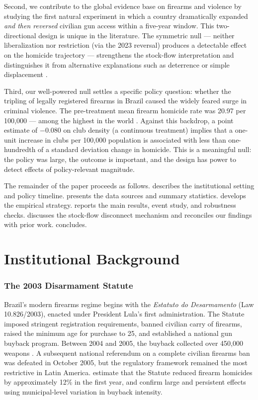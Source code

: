 \documentclass[12pt]{article}
\begin{document}
Second, we contribute to the global evidence base on firearms and violence by studying the first natural experiment in which a country dramatically expanded \textit{and then reversed} civilian gun access within a five-year window. This two-directional design is unique in the literature. The symmetric null --- neither liberalization nor restriction (via the 2023 reversal) produces a detectable effect on the homicide trajectory --- strengthens the stock-flow interpretation and distinguishes it from alternative explanations such as deterrence \citep{lottmustard1997} or simple displacement \citep{levitt2004crime}.

Third, our well-powered null settles a specific policy question: whether the tripling of legally registered firearms in Brazil caused the widely feared surge in criminal violence. The pre-treatment mean firearm homicide rate was 20.97 per 100,000 --- among the highest in the world \citep{soares2006homicide}. Against this backdrop, a point estimate of $-0.080$ on club density (a continuous treatment) implies that a one-unit increase in clubs per 100,000 population is associated with less than one-hundredth of a standard deviation change in homicide. This is a meaningful null: the policy was large, the outcome is important, and the design has power to detect effects of policy-relevant magnitude.

The remainder of the paper proceeds as follows.  describes the institutional setting and policy timeline.  presents the data sources and summary statistics.  develops the empirical strategy.  reports the main results, event study, and robustness checks.  discusses the stock-flow disconnect mechanism and reconciles our findings with prior work.  concludes.


\section{Institutional Background}
\label{sec:background}

\subsubsection*{The 2003 Disarmament Statute} Brazil's modern firearms regime begins with the \textit{Estatuto do Desarmamento} (Law 10.826/2003), enacted under President Lula's first administration. The Statute imposed stringent registration requirements, banned civilian carry of firearms, raised the minimum age for purchase to 25, and established a national gun buyback program. Between 2004 and 2005, the buyback collected over 450,000 weapons \citep{depetris2021disarmament}. A subsequent national referendum on a complete civilian firearms ban was defeated in October 2005, but the regulatory framework remained the most restrictive in Latin America. \citet{cerqueiramello2013} estimate that the Statute reduced firearm homicides by approximately 12\% in the first year, and \citet{almeidahartung2021} confirm large and persistent effects using municipal-level variation in buyback intensity.
\end{document}
